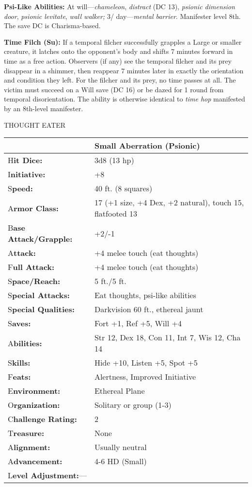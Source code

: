 \documentclass{article}
\begin{document}
\textbf{Psi-Like Abilities:} At will---\textit{chameleon}, \textit{distract }(DC 
13), \textit{psionic dimension door}, \textit{psionic levitate}, \textit{wall walker; 
}3/ day---\textit{mental barrier}. Manifester level 8th. The save DC is Charisma-based.

\textbf{Time Filch (Su):} If a temporal filcher successfully grapples a Large or 
smaller creature, it latches onto the opponent's body and shifts 7 minutes forward 
in time as a free action. Observers (if any) see the temporal filcher and its prey 
disappear in a shimmer, then reappear 7 minutes later in exactly the orientation 
and condition they left. For the filcher and its prey, no time passes at all. The 
victim must succeed on a Will save (DC 16) or be dazed for 1 round from temporal 
disorientation. The ability is otherwise identical to \textit{time hop }manifested 
by an 8th-level manifester.

\vspace{12pt}
{\LARGE{}THOUGHT EATER}

\begin{tabular}{|>{\raggedright}p{91pt}|>{\raggedright}p{223pt}|}
\hline
  & Small Aberration (Psionic)\tabularnewline
\hline
H\textbf{it Dice:} & 3d8 (13 hp)\tabularnewline
\hline
I\textbf{nitiative:} & +8\tabularnewline
\hline
S\textbf{peed:} & 40 ft. (8 squares)\tabularnewline
\hline
A\textbf{rmor Class:} & 17 (+1 size, +4 Dex, +2 natural), touch 15, flatfooted 
13\tabularnewline
\hline
B\textbf{ase Attack/Grapple:} & +2/-1\tabularnewline
\hline
A\textbf{ttack:} & +4 melee touch (eat thoughts)\tabularnewline
\hline
F\textbf{ull Attack:} & +4 melee touch (eat thoughts)\tabularnewline
\hline
S\textbf{pace/Reach:} & 5 ft./5 ft.\tabularnewline
\hline
S\textbf{pecial Attacks:} & Eat thoughts, psi-like abilities\tabularnewline
\hline
S\textbf{pecial Qualities:} & Darkvision 60 ft., ethereal jaunt\tabularnewline
\hline
S\textbf{aves:} & Fort +1, Ref +5, Will +4\tabularnewline
\hline
A\textbf{bilities:} & Str 12, Dex 18, Con 11, Int 7, Wis 12, Cha 14\tabularnewline
\hline
S\textbf{kills:} & Hide +10, Listen +5, Spot +5\tabularnewline
\hline
F\textbf{eats:} & Alertness, Improved Initiative\tabularnewline
\hline
E\textbf{nvironment:} & Ethereal Plane\tabularnewline
\hline
O\textbf{rganization:} & Solitary or group (1-3)\tabularnewline
\hline
C\textbf{hallenge Rating:} & 2\tabularnewline
\hline
T\textbf{reasure:} & None\tabularnewline
\hline
A\textbf{lignment:} & Usually neutral\tabularnewline
\hline
A\textbf{dvancement:} & 4-6 HD (Small)\tabularnewline
\hline
L\textbf{evel Adjustment:}--- & \tabularnewline
\hline
\end{tabular}
\end{document}
